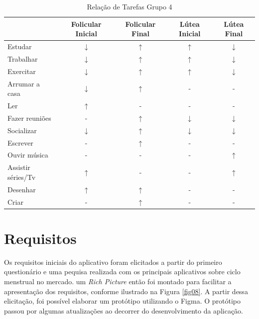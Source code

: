\begin{table}[]
    \centering
    \caption{Relação de Tarefas Grupo 4}
    \label{tab13}
    \begin{tabular}{|l|c|c|c|c|}
    \hline
    \rowcolor[HTML]{C0C0C0} 
    \multicolumn{1}{|c|}{\cellcolor[HTML]{C0C0C0}Tarefas recomendadas}  & Folicular Inicial & Folicular Final  & Lútea Inicial& Lútea Final \\ \hline
    Estudar & $\downarrow$  & $\uparrow$ & $\uparrow$ & $\downarrow$ \\ \hline
    \rowcolor[HTML]{EFEFEF} 
    Trabalhar & $\downarrow$ & $\uparrow$  & $\uparrow$ &  $\downarrow$  \\ \hline
    Exercitar & $\downarrow$ & $\uparrow$ & $\uparrow$ &  $\downarrow$  \\ \hline
    \rowcolor[HTML]{EFEFEF} 
    Arrumar a casa  & $\downarrow$ & $\uparrow$  & - & - \\ \hline
    Ler & $\uparrow$ & -  & - & - \\ \hline
    \rowcolor[HTML]{EFEFEF} 
    Fazer reuniões & - & $\uparrow$ & $\downarrow$ & $\downarrow$ \\ \hline
    \rowcolor[HTML]{EFEFEF} 
    Socializar & $\downarrow$ & $\uparrow$  & $\downarrow$ & $\downarrow$ \\ \hline
    \rowcolor[HTML]{EFEFEF} 
    Escrever & - & $\uparrow$  & - & - \\ \hline
    Ouvir música & - & - & - & $\uparrow$ \\ \hline
    \rowcolor[HTML]{EFEFEF} 
    Assistir séries/Tv & $\uparrow$ & - & - & $\uparrow$ \\ \hline
    Desenhar & $\uparrow$ & $\uparrow$  & - & - \\ \hline
    \rowcolor[HTML]{EFEFEF} 
    Criar & - & $\uparrow$  & - & - \\ \hline
    \end{tabular}
    \end{table}

\section{Requisitos}

Os requisitos iniciais do aplicativo foram elicitados a partir do primeiro questionário e uma pequisa realizada 
com os principais aplicativos sobre ciclo menstrual no mercado.  
um \emph{Rich Picture} então foi montado para facilitar a apresentação dos requisitos, conforme ilustrado na Figura \ref{fig08}.
A partir dessa elicitação, foi possível elaborar um protótipo utilizando o Figma. O protótipo passou por 
algumas atualizações ao decorrer do desenvolvimento da aplicação.

